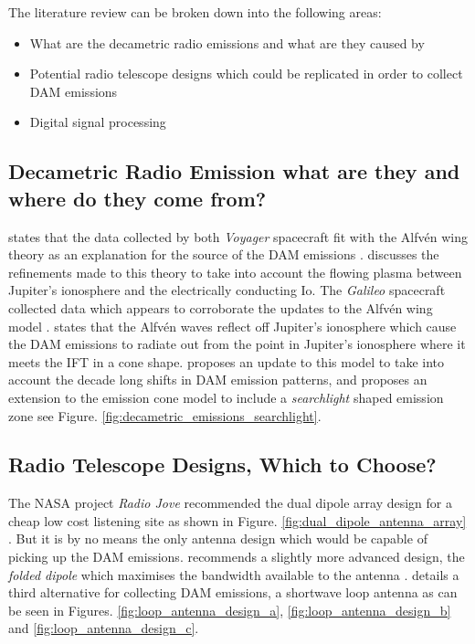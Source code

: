 \documentclass[runningheads,a4paper]{llncs}
\begin{document}
The literature review can be broken down into the following areas:


\begin{itemize}
  \item[\textbullet] What are the decametric radio emissions and what are they caused by
  \item[\textbullet] Potential radio telescope designs which could be replicated in order to collect DAM emissions
  \item[\textbullet] Digital signal processing
\end{itemize}

\subsection*{Decametric Radio Emission what are they and where do they come from?}
\cite{belcher87} states that the data collected by both \textit{Voyager} spacecraft fit with the Alfv\'en wing theory as an explanation for the source of the \gls{DAM} emissions \citep{belcher87}. \cite{kivelson96} discusses the refinements made to this theory to take into account the flowing plasma between Jupiter's ionosphere and the electrically conducting Io. The \textit{Galileo} spacecraft collected data which appears to corroborate the updates to the Alfv\'en wing model \citep{kivelson96}. \cite{bose08} states that the Alfv\'en waves reflect off Jupiter's ionosphere which cause the \gls{DAM} emissions to radiate out from the point in Jupiter's ionosphere where it meets the \gls{IFT} in a cone shape. \cite{imai-08} proposes an update to this model to take into account the decade long shifts in \gls{DAM} emission patterns, and proposes an extension to the emission cone model to include a \textit{searchlight} shaped emission zone \citep{imai-08} see Figure. \ref{fig:decametric_emissions_searchlight}.

\subsection*{Radio Telescope Designs, Which to Choose?}
The NASA project \textit{Radio Jove} recommended the dual dipole array design for a cheap low cost listening site as shown in Figure. \ref{fig:dual_dipole_antenna_array} \citep{nasa12}. But it is by no means the only antenna design which would be capable of picking up the \gls{DAM} emissions. \cite{wilkinson94} recommends a slightly more advanced design, the \textit{folded dipole} which maximises the bandwidth available to the antenna \citep{wilkinson94}. \cite{greef-12} details a third alternative for collecting \gls{DAM} emissions, a shortwave loop antenna as can be seen in Figures. \ref{fig:loop_antenna_design_a}, \ref{fig:loop_antenna_design_b} and \ref{fig:loop_antenna_design_c}.
\end{document}
